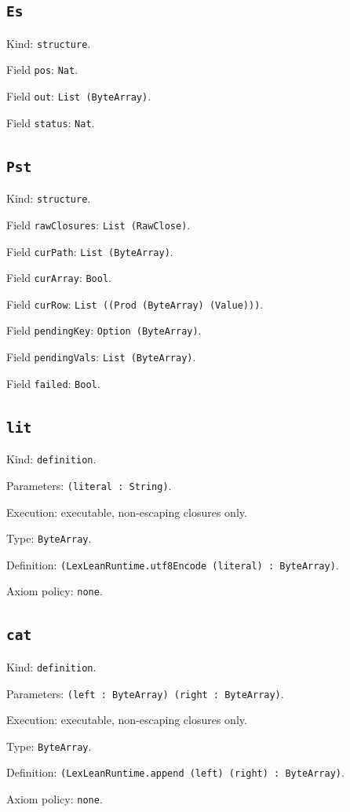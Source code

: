 \documentclass[11pt]{article}
\begin{document}
\subsection*{\texttt{Es}}
\noindent Kind: \texttt{structure}.\par
\noindent Field \texttt{pos}: \texttt{Nat}.\par
\noindent Field \texttt{out}: \texttt{List (ByteArray)}.\par
\noindent Field \texttt{status}: \texttt{Nat}.\par
\subsection*{\texttt{Pst}}
\noindent Kind: \texttt{structure}.\par
\noindent Field \texttt{rawClosures}: \texttt{List (RawClose)}.\par
\noindent Field \texttt{curPath}: \texttt{List (ByteArray)}.\par
\noindent Field \texttt{curArray}: \texttt{Bool}.\par
\noindent Field \texttt{curRow}: \texttt{List ((Prod (ByteArray) (Value)))}.\par
\noindent Field \texttt{pendingKey}: \texttt{Option (ByteArray)}.\par
\noindent Field \texttt{pendingVals}: \texttt{List (ByteArray)}.\par
\noindent Field \texttt{failed}: \texttt{Bool}.\par
\subsection*{\texttt{lit}}
\noindent Kind: \texttt{definition}.\par
\noindent Parameters: \texttt{(literal : String)}.\par
\noindent Execution: executable, non-escaping closures only.\par
\noindent Type: \texttt{ByteArray}.\par
\noindent Definition: \texttt{(LexLeanRuntime.utf8Encode (literal) : ByteArray)}.\par
\noindent Axiom policy: \texttt{none}.\par
\subsection*{\texttt{cat}}
\noindent Kind: \texttt{definition}.\par
\noindent Parameters: \texttt{(left : ByteArray) (right : ByteArray)}.\par
\noindent Execution: executable, non-escaping closures only.\par
\noindent Type: \texttt{ByteArray}.\par
\noindent Definition: \texttt{(LexLeanRuntime.append (left) (right) : ByteArray)}.\par
\noindent Axiom policy: \texttt{none}.\par
\end{document}
